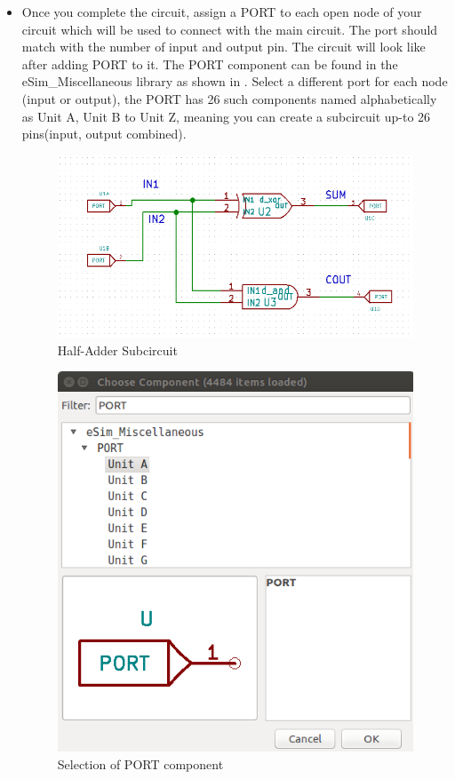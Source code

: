 \begin{itemize}
\item Once you complete the circuit, assign a PORT to each open node of your circuit which will be used to connect with the main circuit. The port should match with the number of input and output pin. The circuit will look like  after adding PORT to it. The PORT component can be found in the eSim\_Miscellaneous library as shown in . Select a different port for each node (input or output), the PORT has 26 such components named alphabetically as Unit A, Unit B to Unit Z, meaning you can create a subcircuit up-to 26 pins(input, output combined).
        
    
        \begin{figure}[!htp]
            \centering
            \includegraphics[width =\hgfig]{ha_sub.png}
            \caption{Half-Adder Subcircuit }
            \label{halfadder}
        \end{figure}


        \begin{figure}[!htp]
            \centering
            \includegraphics[width =\smfig]{misc_port_list.png}
            \caption{Selection of PORT component}
            \label{port}
        \end{figure}


\end{itemize}
